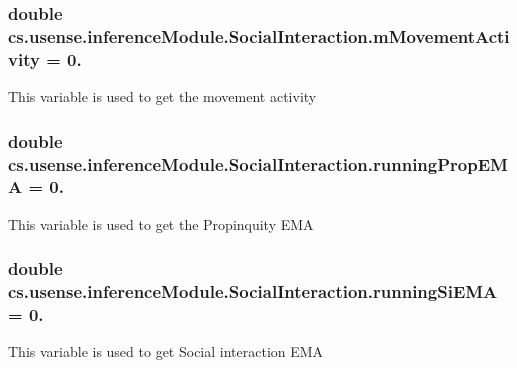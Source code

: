 \subsubsection[{m\+Movement\+Activity}]{\setlength{\rightskip}{0pt plus 5cm}double cs.\+usense.\+inference\+Module.\+Social\+Interaction.\+m\+Movement\+Activity = 0.\hspace{0.3cm}{\ttfamily [static]}}\label{classcs_1_1usense_1_1inference_module_1_1_social_interaction_ab00945e5a52810f2d7e051f2e4878d4c}
This variable is used to get the movement activity \hypertarget{classcs_1_1usense_1_1inference_module_1_1_social_interaction_a9ccb6dd9852d453b7d6da585f41b39f8}{}
\subsubsection[{running\+Prop\+E\+M\+A}]{\setlength{\rightskip}{0pt plus 5cm}double cs.\+usense.\+inference\+Module.\+Social\+Interaction.\+running\+Prop\+E\+M\+A = 0.\hspace{0.3cm}{\ttfamily [private]}}\label{classcs_1_1usense_1_1inference_module_1_1_social_interaction_a9ccb6dd9852d453b7d6da585f41b39f8}
This variable is used to get the Propinquity E\+M\+A \hypertarget{classcs_1_1usense_1_1inference_module_1_1_social_interaction_ac3b63042cb32fc5290ec5a4676cb423e}{}
\subsubsection[{running\+Si\+E\+M\+A}]{\setlength{\rightskip}{0pt plus 5cm}double cs.\+usense.\+inference\+Module.\+Social\+Interaction.\+running\+Si\+E\+M\+A = 0.\hspace{0.3cm}{\ttfamily [private]}}\label{classcs_1_1usense_1_1inference_module_1_1_social_interaction_ac3b63042cb32fc5290ec5a4676cb423e}
This variable is used to get Social interaction E\+M\+A \hypertarget{classcs_1_1usense_1_1inference_module_1_1_social_interaction_a20e5c3ed4759d13c153406d2145d11b5}{}
